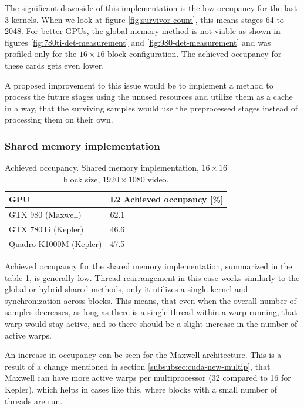 The significant downside of this implementation is the low occupancy for the last 3 kernels. When we look at figure \ref{fig:survivor-count}, this means stages 64 to 2048. For better GPUs, the global memory method is not viable as shown in figures \ref{fig:780ti-det-measurement} and \ref{fig:980-det-measurement} and was profiled only for the $16 \times 16$ block configuration. The achieved occupancy for these cards gets even lower.

A proposed improvement to this issue would be to implement a method to process the future stages using the unused resources and utilize them as a cache in a way, that the surviving samples would use the preprocessed stages instead of processing them on their own.

\subsubsection{Shared memory implementation}\label{subsubsec:prof-occ-shared-memory}

\begin{table}[htbp]
\centering
\begin{tabular}{| l | l |}
\hline
GPU & L2 Achieved occupancy [\%] \\
\hline
GTX 980 (Maxwell) & 62.1 \\
\hline
GTX 780Ti (Kepler) & 46.6 \\
\hline
Quadro K1000M (Kepler) & 47.5 \\
\hline
\end{tabular}
\caption{Achieved occupancy. Shared memory implementation, $16 \times 16$ block size, $1920 \times 1080$ video.}
\label{tab:ach-occupancy-shared}
\end{table}

Achieved occupancy for the shared memory implementation, summarized in the table \ref{tab:ach-occupancy-shared}, is generally low. Thread rearrangement in this case works similarly to the global or hybrid-shared methods, only it utilizes a single kernel and synchronization across blocks. This means, that even when the overall number of samples decreases, as long as there is a single thread within a warp running, that warp would stay active, and so there should be a slight increase in the number of active warps.

An increase in occupancy can be seen for the Maxwell architecture. This is a result of a change mentioned in section \ref{subsubsec:cuda-new-multip}, that Maxwell can have more active warps per multiprocessor (32 compared to 16 for Kepler), which helps in cases like this, where blocks with a small number of threads are run.


